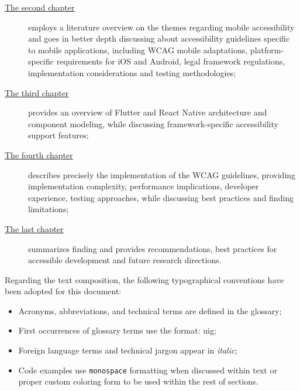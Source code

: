 \begin{description}
    \item[{\hyperref[chap:accessibility]{The second chapter}}] employs a literature overview on the themes regarding mobile accessibility and goes in better depth discussing about accessibility guidelines specific to mobile applications, including WCAG mobile adaptations, platform-specific requirements for iOS and Android, legal framework regulations, implementation considerations and testing methodologies;
    
    \item[{\hyperref[chap:frameworks]{The third chapter}}] provides an overview of Flutter and React Native architecture and component modeling, while discussing framework-specific accessibility support features;
    
    \item[{\hyperref[chap:implementation]{The fourth chapter}}] describes precisely the implementation of the WCAG guidelines, providing implementation complexity, performance implications, developer experience, testing approaches, while discussing best practices and finding limitations;
    
    \item[{\hyperref[chap:conclusions]{The last chapter}}] summarizes finding and provides recommendations, best practices for accessible development and future research directions.
\end{description}

Regarding the text composition, the following typographical conventions have been adopted for this document:
\begin{itemize}
    \item Acronyms, abbreviations, and technical terms are defined in the glossary;
    \item First occurrences of glossary terms use the format: \gls{uig};
    \item Foreign language terms and technical jargon appear in \textit{italic};
    \item Code examples use \texttt{monospace} formatting when discussed within text or proper custom coloring form to be used within the rest of sections.
\end{itemize}

\newpage